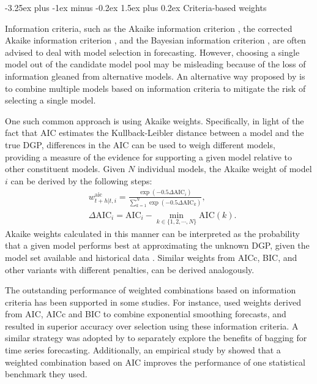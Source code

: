 \documentclass[11pt]{article}
\makeatletter
\renewcommand{\paragraph}{\@startsection{paragraph}{4}{0ex}%
   {-3.25ex plus -1ex minus -0.2ex}%
   {1.5ex plus 0.2ex}%
   {\normalfont\normalsize\bfseries}}
\makeatother
\begin{document}
\paragraph{Criteria-based weights}

Information criteria, such as the Akaike information criterion \citep[AIC,][]{Akaike1974-ya}, the corrected Akaike information criterion \citep[AICc,][]{Sugiura1978-xm}, and the Bayesian information criterion \citep[BIC,][]{Schwarz1978-cz}, are often advised to deal with model selection in forecasting. However, choosing a single model out of the candidate model pool may be misleading because of the loss of information gleaned from alternative models. An alternative way proposed by \citet{Burnham2002-us} is to combine multiple models based on information criteria to mitigate the risk of selecting a single model.

One such common approach is using Akaike weights. Specifically, in light of the fact that AIC estimates the Kullback-Leibler distance \citep{Kullback1951-hl} between a model and the true DGP, differences in the AIC can be used to weigh different models, providing a measure of the evidence for supporting a given model relative to other constituent models. Given $N$ individual models, the Akaike weight of model $i$ can be derived by the following steps:
\begin{align*}
&w_{t+h|t, i}^{\text{aic}}=\frac{\exp (-0.5 \Delta \mathrm{AIC}_{i})}{\sum_{k=1}^{N} \exp \left(-0.5 \Delta \mathrm{AIC}_{k}\right)}, \\
&\Delta \mathrm{AIC}_{i}=\mathrm{AIC}_{i}-\min _{k \in \{1,2,\cdots,N\}} \mathrm{AIC}(k).
\end{align*}
Akaike weights calculated in this manner can be interpreted as the probability that a given model performs best at approximating the unknown DGP, given the model set available and historical data \citep{Kolassa2011-ai}. Similar weights from AICc, BIC, and other variants with different penalties, can be derived analogously.

The outstanding performance of weighted combinations based on information criteria has been supported in some studies. For instance, \citet{Kolassa2011-ai} used weights derived from AIC, AICc and BIC to combine exponential smoothing forecasts, and resulted in superior accuracy over selection using these information criteria. A similar strategy was adopted by \citet{Petropoulos2018-fw} to separately explore the benefits of bagging for time series forecasting. Additionally, an empirical study by \citet{Petropoulos2018-ad} showed that a weighted combination based on AIC improves the performance of one statistical benchmark they used.
\end{document}
